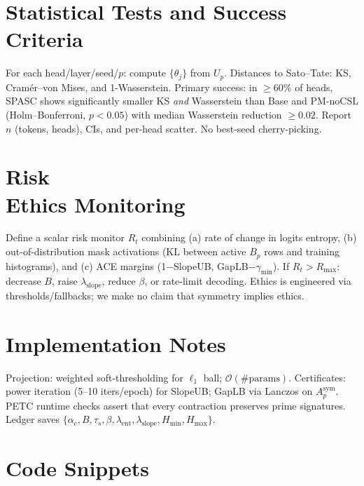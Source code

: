 \documentclass[11pt]{article}
\theoremstyle{definition}
\theoremstyle{remark}
\begin{document}
\section{Statistical Tests and Success Criteria}
For each head/layer/seed/$p$: compute $\{\theta_j\}$ from $U_p$. Distances to Sato--Tate: KS, Cram\'er--von Mises, and 1-Wasserstein. Primary success: in $\ge 60\%$ of heads, SPASC shows significantly smaller KS \emph{and} Wasserstein than Base and PM-noCSL (Holm--Bonferroni, $p<0.05$) with median Wasserstein reduction $\ge 0.02$. Report $n$ (tokens, heads), CIs, and per-head scatter. No best-seed cherry-picking.

\section{Risk \\ Ethics Monitoring}
Define a scalar risk monitor $R_t$ combining (a) rate of change in logits entropy, (b) out-of-distribution mask activations (KL between active $B_p$ rows and training histograms), and (c) ACE margins (1$-$SlopeUB, GapLB$-\gamma_{\min}$). If $R_t>R_{\max}$: decrease $B$, raise $\lambda_{\mathrm{slope}}$, reduce $\beta$, or rate-limit decoding. Ethics is engineered via thresholds/fallbacks; we make no claim that symmetry implies ethics.

\section{Implementation Notes}
Projection: weighted soft-thresholding for $\ell_1$ ball; $\mathcal{O}(\#\text{params})$. Certificates: power iteration (5--10 iters/epoch) for SlopeUB; GapLB via Lanczos on $A_p^{\mathrm{sym}}$. PETC runtime checks assert that every contraction preserves prime signatures. Ledger saves $\{\alpha_c,B,\tau_s,\beta,\lambda_{\mathrm{ent}},\lambda_{\mathrm{slope}},H_{\min},H_{\max}\}$.

\section{Code Snippets}
\end{document}
